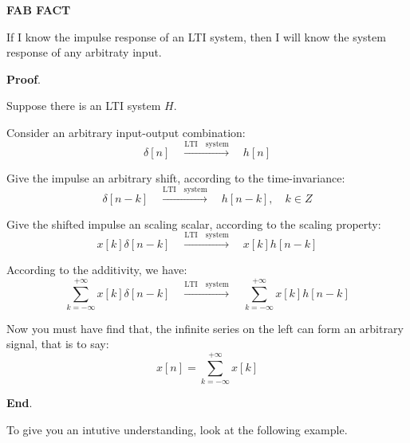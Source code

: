     \noindent \textbf{FAB FACT}

    If I know the impulse response of an LTI system, 
    then I will know the system response of any arbitraty input.

    \noindent \textbf{Proof}.
    
    Suppose there is an LTI system $H$.

    Consider an arbitrary input-output combination:
        \begin{equation}
            \delta[n] \quad \xrightarrow{\mathrm{LTI \quad system}} \quad h[n]
        \end{equation}
    
    Give the impulse an arbitrary shift, according to the time-invariance:
        \begin{equation}
            \delta[n-k] \quad \xrightarrow{\mathrm{LTI \quad system}} \quad h[n-k], \quad k\in Z
        \end{equation}
    
    Give the shifted impulse an scaling scalar, according to the scaling property:
        \begin{equation}
            x[k] \delta[n-k] \quad \xrightarrow{\mathrm{LTI \quad system}} \quad x[k] h[n-k]
        \end{equation}
    
    According to the additivity, we have:
        \begin{equation}
            \sum_{k=-\infty}^{+\infty} x[k] \delta[n-k] \quad \xrightarrow{\mathrm{LTI \quad system}} \quad \sum_{k=-\infty}^{+\infty} x[k] h[n-k]
        \end{equation}

    Now you must have find that, the infinite series on the left can form an arbitrary signal,
    that is to say:
        \begin{equation}
            x[n] = \sum_{k=-\infty}^{+\infty} x[k]
        \end{equation}
    
    \noindent \textbf{End}.

    \noindent To give you an intutive understanding, look at the following example.

